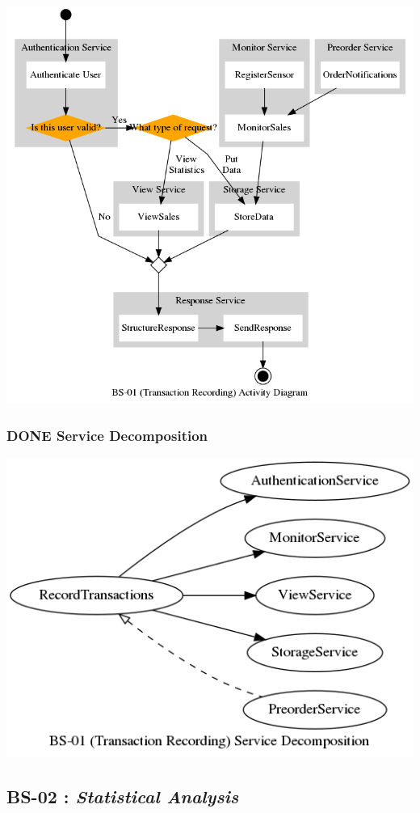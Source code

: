 \documentclass[11pt]{article}
\begin{document}
\begin{center}
\includegraphics[width=.9\linewidth]{res/bs_01_act.png}
\end{center}
\subsubsection{{\bfseries\sffamily DONE} Service Decomposition}
\label{sec:org57ae0cc}
\begin{center}
\includegraphics[width=.9\linewidth]{res/bs_01_dcmp.png}
\end{center}
\newpage

\subsection{\label{org1a13d38}BS-02 : \emph{Statistical Analysis}}
\label{sec:orgf456027}
\end{document}
